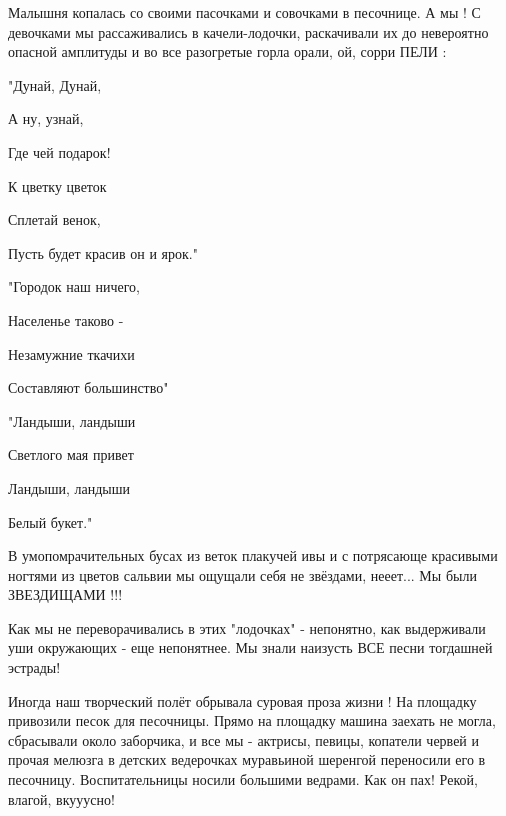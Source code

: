 \begin{multicols}{2}
\end{multicols}

Малышня копалась со своими пасочками и совочками в песочнице. А мы ! С
девочками мы рассаживались в качели-лодочки, раскачивали их до невероятно
опасной амплитуды и во все разогретые горла орали, ой, сорри ПЕЛИ :

"Дунай, Дунай,

 А ну, узнай,

 Где чей подарок!

 К цветку цветок

 Сплетай венок,

 Пусть будет красив он и ярок."

"Городок наш ничего,

 Населенье таково -

 Незамужние ткачихи

 Составляют большинство"

"Ландыши, ландыши

 Светлого мая привет

 Ландыши, ландыши

 Белый букет."

В умопомрачительных бусах из веток плакучей ивы и с потрясающе красивыми
ногтями из цветов сальвии мы ощущали себя не звёздами, нееет... Мы были
ЗВЕЗДИЩАМИ !!!

Как мы не переворачивались в этих "лодочках" - непонятно, как выдерживали уши
окружающих - еще непонятнее. Мы знали наизусть ВСЕ песни тогдашней эстрады!

Иногда наш творческий полёт обрывала суровая проза жизни ! На площадку
привозили песок для песочницы. Прямо на площадку машина заехать не могла,
сбрасывали около заборчика, и все мы - актрисы, певицы, копатели червей и
прочая мелюзга в детских ведерочках муравьиной шеренгой переносили его в
песочницу. Воспитательницы носили большими ведрами. Как он пах! Рекой, влагой,
вкууусно!

